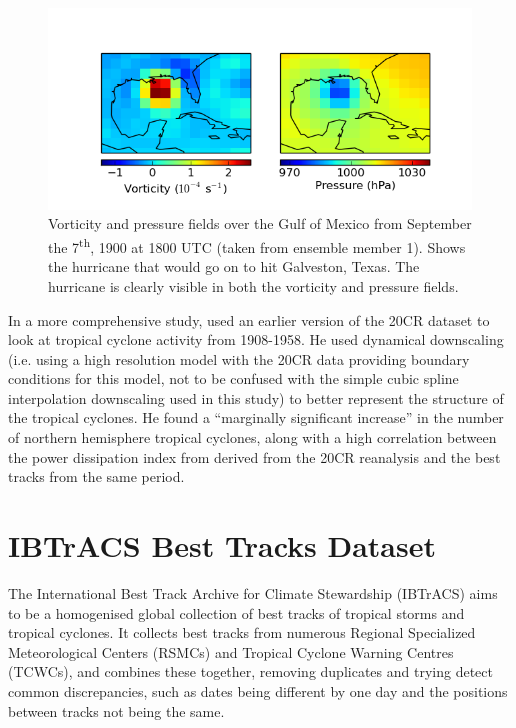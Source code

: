 \documentclass[pdftex,12pt,a4paper]{report}
\newcommand{\ts}{\textsuperscript}
\begin{document}
\begin{figure}[ht!]
    \centering
    \includegraphics[width=\textwidth]{figures/galveston_1900-9-7_18-00_em0}
    \caption{Vorticity and pressure fields over the Gulf of Mexico from September the 7\ts{th}, 1900
        at 1800 UTC (taken from ensemble member 1). Shows the hurricane that would go on to hit Galveston,
        Texas. The hurricane is clearly visible in both the vorticity and pressure fields.}
    \label{fig:galveston}
\end{figure}

In a more comprehensive study, \textcite{emanuel2010tropical} used an earlier version of the 20CR
dataset to look at tropical cyclone activity from 1908-1958. He used dynamical downscaling (i.e.
using a high resolution model with the 20CR data providing boundary conditions for this model, not
to be confused with the simple cubic spline interpolation downscaling used in this study) to better
represent the structure of the tropical cyclones. He found a ``marginally significant increase'' in
the number of northern hemisphere tropical cyclones, along with a high correlation between the power
dissipation index from derived from the 20CR reanalysis and the best tracks from the same period.

\section{IBTrACS Best Tracks Dataset}
\label{sec:ibtracs}
The International Best Track Archive for Climate Stewardship (IBTrACS)
\parencite{knappInternational2010} aims to be a homogenised global collection of best tracks of
tropical storms and tropical cyclones. It collects best tracks from numerous Regional Specialized
Meteorological Centers (RSMCs) and Tropical Cyclone Warning Centres (TCWCs), and combines these
together, removing duplicates and trying detect common discrepancies, such as dates being different
by one day and the positions between tracks not being the same.
\end{document}
